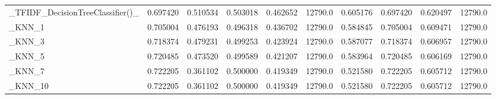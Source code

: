 \begin{tabular}{lrrrrrrrrr}
\_TFIDF\_DecisionTreeClassifier()\_                   &  0.697420 &         0.510534 &      0.503018 &        0.462652 &        12790.0 &            0.605176 &         0.697420 &           0.620497 &           12790.0 \\
\_KNN\_1                                             &  0.705004 &         0.476193 &      0.496318 &        0.436702 &        12790.0 &            0.584845 &         0.705004 &           0.609471 &           12790.0 \\
\_KNN\_3                                             &  0.718374 &         0.479231 &      0.499253 &        0.423924 &        12790.0 &            0.587077 &         0.718374 &           0.606957 &           12790.0 \\
\_KNN\_5                                             &  0.720485 &         0.473520 &      0.499589 &        0.421207 &        12790.0 &            0.583964 &         0.720485 &           0.606169 &           12790.0 \\
\_KNN\_7                                             &  0.722205 &         0.361102 &      0.500000 &        0.419349 &        12790.0 &            0.521580 &         0.722205 &           0.605712 &           12790.0 \\
\_KNN\_10                                            &  0.722205 &         0.361102 &      0.500000 &        0.419349 &        12790.0 &            0.521580 &         0.722205 &           0.605712 &           12790.0 \\
\bottomrule
\end{tabular}
